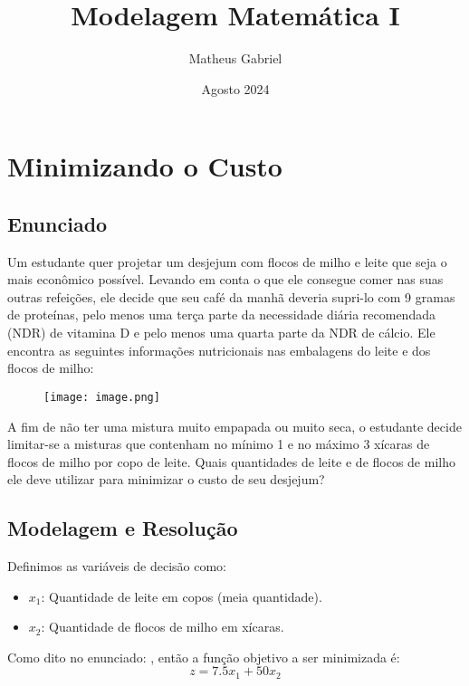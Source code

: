 \documentclass{article}
\title{Modelagem Matemática I}
\author{Matheus Gabriel}
\date{Agosto 2024}
\begin{document}
\maketitle

\section{Minimizando o Custo}

\subsection{Enunciado}
Um estudante quer projetar um desjejum com flocos de milho e leite que seja o  mais econômico possível. Levando em conta o que ele consegue comer nas  suas outras refeições, ele decide que seu café da manhã deveria supri-lo com 9  gramas de proteínas, pelo menos uma terça parte da necessidade diária  recomendada (NDR) de vitamina D e pelo menos uma quarta parte da NDR de  cálcio. Ele encontra as seguintes informações nutricionais nas embalagens do  leite e dos flocos de milho:

\begin{figure}[h]
    \centering
    \texttt{[image: image.png]}
\end{figure}

A fim de não ter uma mistura muito empapada ou muito seca, o estudante  decide limitar-se a misturas que contenham no mínimo 1 e no máximo 3 xícaras  de flocos de milho por copo de leite. Quais quantidades de leite e de flocos de  milho ele deve utilizar para minimizar o custo de seu desjejum?

\subsection{Modelagem e Resolução}

Definimos as variáveis de decisão como:
\begin{itemize}
    \item $x_1$: Quantidade de leite em copos (meia quantidade).
    \item $x_2$: Quantidade de flocos de milho em xícaras.
\end{itemize}

Como dito no enunciado: , então a função objetivo a ser minimizada é:
\begin{equation}
    z = 7.5x_1 + 50x_2
\end{equation}
\end{document}
